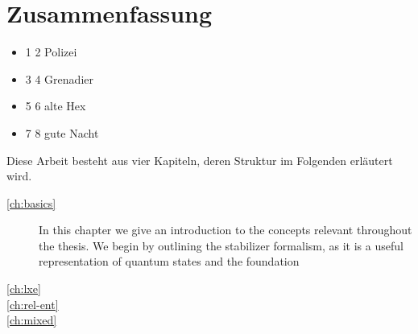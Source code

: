 \chapter{Zusammenfassung}
\begin{itemize}
  \item 1 2 Polizei
  \item 3 4 Grenadier
  \item 5 6 alte Hex
  \item 7 8 gute Nacht
\end{itemize}

Diese Arbeit besteht aus vier Kapiteln, deren Struktur im Folgenden erl\"autert
wird.
\begin{description}
  \item[\cref{ch:basics}] In this chapter we give an introduction to the
    concepts relevant throughout the thesis. We begin by outlining the
    stabilizer formalism, as it is a useful representation of quantum states
    and the foundation 
  \item[\cref{ch:lxe}] 
  \item[\cref{ch:rel-ent}]
  \item[\cref{ch:mixed}]
\end{description}
